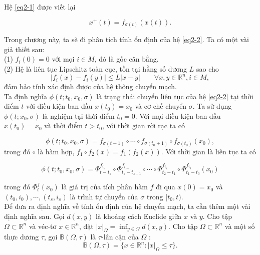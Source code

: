 \documentclass[14pt,a4paper,oneside]{report}		%
\begin{document}
Hệ \ref{eq2-1} được viết lại

\begin{equation} \label{eq2-2}
x^+(t)=f_{\sigma (t)}(x(t)).
\end{equation}

Trong chương này, ta sẽ đi phân tích tính ổn định của hệ \ref{eq2-2}. Ta có một vài giả thiết sau:\\
(1) $f_i(0)=0$ với mọi $i\in M$, đó là gốc cân bằng.\\
(2) Hệ là liên tục Lipschitz toàn cục, tồn tại hằng số dương $L$ sao cho
\begin{equation} \label{eq2-3}
|f_i(x)-f_i(y)|\leq L|x-y|\qquad \forall x,y \in \mathbb{R}^n, i\in M,
\end{equation}
đảm bảo tính xác định được của hệ thông chuyển mạch.\\
Ta định nghĩa $\phi (t;t_0,x_0,\sigma)$ là trạng thái chuyển liên tục của hệ \ref{eq2-2} tại thời điểm $t$ với điều kiện ban đầu $x(t_0)=x_0$ và cơ chế chuyển $\sigma$. Ta sử dụng $\phi (t;x_0,\sigma)$ là nghiệm tại thời điểm $t_0 = 0$. Với mọi điều kiện ban đầu $x(t_0)=x_0$ và thời điểm $t>t_0$, với thời gian rời rạc ta có

\begin{equation} \label{eq2-4}
\phi (t;t_0,x_0,\sigma)=f_{\sigma (t-1)}\circ \cdots \circ f_{\sigma (t_0+1)}\circ f_{\sigma (t_0)}(x_0),
\end{equation}
trong đó $\circ$ là hàm hợp, $f_1 \circ f_2(x) = f_1(f_2(x))$. Với thời gian là liên tục ta có

\begin{equation} \label{eq2-5}
\phi (t;t_0,x_0,\sigma )=\Phi^{f_{i_s}}_{t-t_s}\circ\Phi^{f_{i_{s-1}}}_{t_s-t_{s-1}}\circ\cdots\circ\Phi^{f_{i_{1}}}_{t_2-t_{1}}\circ\Phi^{f_{i_{0}}}_{t_1-t_{0}}(x_0)
\end{equation}

trong đó $\Phi^f_t(x_0)$ là giá trị của tích phân hàm $f$ đi qua $x(0)=x_0$ và $(t_0,i_0),\cdots ,(t_s,i_s)$ là trình tự chuyển của $\sigma$ trong $[t_0,t)$.\\
Để đưa ra định nghĩa về tính ổn định của hệ chuyển mạch, ta cần thêm một vài định nghĩa sau. Gọi $d(x,y)$ là khoảng cách Euclide giữa $x$ và $y$. Cho tập $\Omega \subset\mathbb{R}^n$ và véc-tơ $x\in\mathbb{R}^n$, đặt $|x|_\Omega = \inf_{y\in\Omega}d(x,y)$. Cho tập $\Omega\subset\mathbb{R}^n$ và một số thực dương $\tau$, gọi $\mathbb{B}(\Omega , \tau)$ là $\tau$-lân cận của $\Omega$ :
$$\mathbb{B}(\Omega,\tau)=\{x\in\mathbb{R}^n:|x|_\Omega\leq\tau\}.$$
\end{document}
